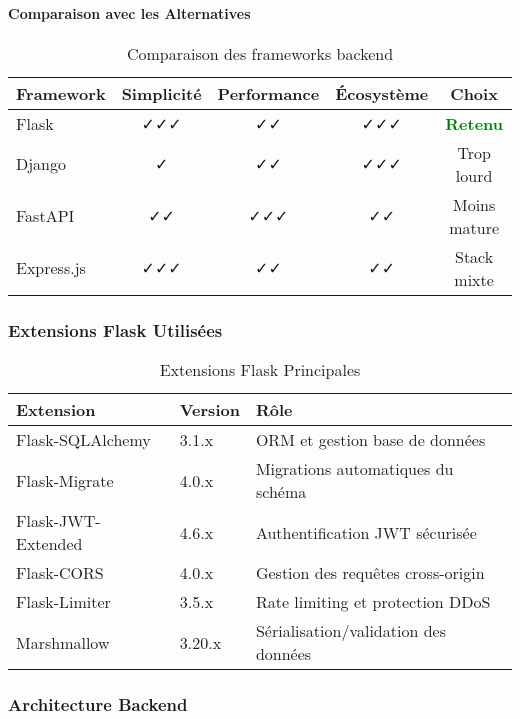 \paragraph{Comparaison avec les Alternatives}

\begin{table}[H]
\centering
\begin{tabular}{|l|c|c|c|c|}
\hline
\textbf{Framework} & \textbf{Simplicité} & \textbf{Performance} & \textbf{Écosystème} & \textbf{Choix} \\
\hline
Flask & ✓✓✓ & ✓✓ & ✓✓✓ & \textcolor{green}{\textbf{Retenu}} \\
Django & ✓ & ✓✓ & ✓✓✓ & Trop lourd \\
FastAPI & ✓✓ & ✓✓✓ & ✓✓ & Moins mature \\
Express.js & ✓✓✓ & ✓✓ & ✓✓ & Stack mixte \\
\hline
\end{tabular}
\caption{Comparaison des frameworks backend}
\end{table}

\subsubsection{Extensions Flask Utilisées}

\begin{table}[H]
\centering
\begin{tabular}{|l|l|p{6cm}|}
\hline
\textbf{Extension} & \textbf{Version} & \textbf{Rôle} \\
\hline
Flask-SQLAlchemy & 3.1.x & ORM et gestion base de données \\
Flask-Migrate & 4.0.x & Migrations automatiques du schéma \\
Flask-JWT-Extended & 4.6.x & Authentification JWT sécurisée \\
Flask-CORS & 4.0.x & Gestion des requêtes cross-origin \\
Flask-Limiter & 3.5.x & Rate limiting et protection DDoS \\
Marshmallow & 3.20.x & Sérialisation/validation des données \\
\hline
\end{tabular}
\caption{Extensions Flask Principales}
\end{table}

\subsubsection{Architecture Backend}

